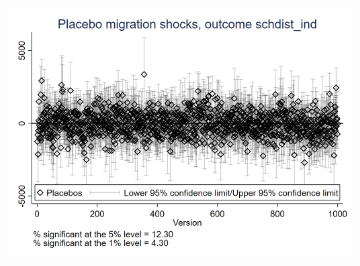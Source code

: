 \documentclass{article}
\begin{document}
\begin{figure}[htbp]
\begin{subfigure}{0.3\textwidth}
    \end{subfigure}
    \begin{subfigure}{0.3\textwidth}
        \includegraphics[width=\linewidth]{exhibits_old/figures/exogeneity_tests/D17_placebo_schdist_ind_urban.png}
        \label{fig:sub3}
    \end{subfigure}


\end{figure}
\end{document}
